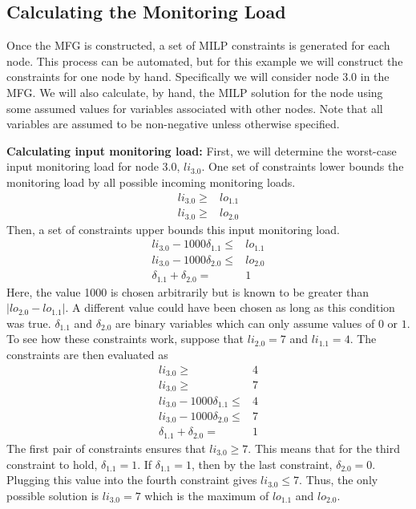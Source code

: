 \subsection{Calculating the Monitoring Load}
Once the MFG is constructed, a set of MILP constraints is generated for each
node. This process can be automated, but for this example we will construct the
constraints for one node by hand. Specifically we will consider node 3.0 in the
MFG. We will also calculate, by hand, the MILP solution for the node using some
assumed values for variables associated with other nodes. Note that all
variables are assumed to be non-negative unless otherwise specified.

{\bf Calculating input monitoring load:}
First, we will determine the worst-case input monitoring load for node 3.0,
$li_{3.0}$.  One set of constraints lower bounds the monitoring load by all
possible incoming monitoring loads.
\begin{align*}
  li_{3.0} \geq& lo_{1.1} \\
  li_{3.0} \geq& lo_{2.0} 
\end{align*}
Then, a set of constraints upper bounds this input monitoring load.
\begin{align*}
  li_{3.0} - 1000 \delta_{1.1} \leq& lo_{1.1} \\
  li_{3.0} - 1000 \delta_{2.0} \leq& lo_{2.0} \\
  \delta_{1.1} + \delta_{2.0} =& 1
\end{align*}
Here, the value 1000 is chosen arbitrarily but is known to be greater than
$|lo_{2.0} - lo_{1.1}|$.  A different value could have been chosen as long as
this condition was true.  $\delta_{1.1}$ and $\delta_{2.0}$ are binary
variables which can only assume values of $0$ or $1$.  To see how these
constraints work, suppose that $li_{2.0} = 7$ and $li_{1.1} = 4$. The
constraints are then evaluated as
\begin{align*}
  li_{3.0} \geq& 4 \\
  li_{3.0} \geq& 7 \\
  li_{3.0} - 1000 \delta_{1.1} \leq& 4 \\
  li_{3.0} - 1000 \delta_{2.0} \leq& 7 \\
  \delta_{1.1} + \delta_{2.0} =& 1
\end{align*}
The first pair of constraints ensures that $li_{3.0} \geq 7$. This means that
for the third constraint to hold, $\delta_{1.1} = 1$. If $\delta_{1.1} = 1$,
then by the last constraint, $\delta_{2.0} = 0$. Plugging this value into the
fourth constraint gives $li_{3.0} \leq 7$. Thus, the only possible solution is
$li_{3.0} = 7$ which is the maximum of $lo_{1.1}$ and $lo_{2.0}$.

